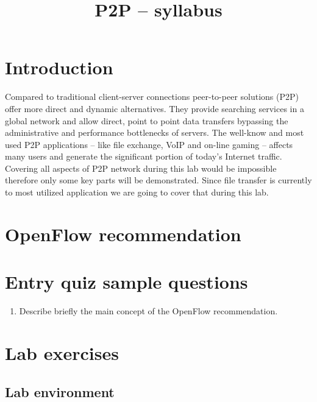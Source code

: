 \documentclass[a4paper]{article}
\title{P2P – syllabus}
\author{}
\date{}
\begin{document}
\maketitle

\tableofcontents

\section{Introduction}

Compared to traditional client-server connections peer-to-peer solutions (P2P) offer more direct and dynamic alternatives. They provide searching services in a global network and allow direct, point to point data transfers bypassing the administrative and performance bottlenecks of servers.
The well-know and most used P2P applications -- like file exchange, VoIP and on-line gaming -- affects many users and generate the significant portion of today's Internet traffic. Covering all aspects of P2P network during this lab would be impossible therefore only some key parts will be demonstrated. Since file transfer is currently to most utilized application we are going to cover that during this lab.

\section{OpenFlow recommendation}


\appendix

\section{Entry quiz sample questions}

\begin{enumerate}
    \item Describe briefly the main concept of the OpenFlow recommendation.
\end{enumerate}

\section{Lab exercises}

\subsection{Lab environment}
\end{document}
